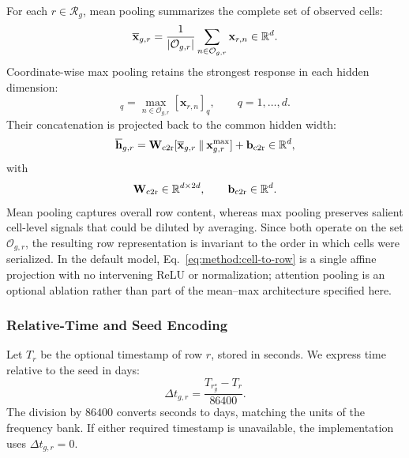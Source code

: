 For each \(r\in\mathcal R_g\), mean pooling summarizes the complete set of
observed cells:
\begin{equation}
  \overline{\mathbf x}_{g,r}
  =
  \frac{1}{|\mathcal O_{g,r}|}
  \sum_{n\in\mathcal O_{g,r}}\mathbf x_{r,n}
  \in\mathbb{R}^d.
\label{eq:method:mean-pooling}
\end{equation}
Coordinate-wise max pooling retains the strongest response in each hidden
dimension:
\begin{equation}
  [\mathbf x_{g,r}^{\max}]_q
  =
  \max_{n\in\mathcal O_{g,r}}[\mathbf x_{r,n}]_q,
  \qquad q=1,\ldots,d.
\label{eq:method:max-pooling}
\end{equation}
Their concatenation is projected back to the common hidden width:
\begin{equation}
  \overline{\mathbf h}_{g,r}
  =
  \mathbf W_{\mathrm{c2r}}
  [\overline{\mathbf x}_{g,r}\mathbin{\Vert}\mathbf x_{g,r}^{\max}]
  +\mathbf b_{\mathrm{c2r}}
  \in\mathbb{R}^d,
\label{eq:method:cell-to-row}
\end{equation}
with
\begin{equation}
  \mathbf W_{\mathrm{c2r}}\in\mathbb{R}^{d\times2d},
  \qquad
  \mathbf b_{\mathrm{c2r}}\in\mathbb{R}^d.
\label{eq:method:c2r-parameter-domains}
\end{equation}
Mean pooling captures overall row content, whereas max pooling preserves
salient cell-level signals that could be diluted by averaging. Since both
operate on the set \(\mathcal O_{g,r}\), the resulting row representation
is invariant to the order in which cells were serialized. In the default
model, Eq.~\eqref{eq:method:cell-to-row} is a single affine projection with
no intervening ReLU or normalization; attention pooling is an optional
ablation rather than part of the mean--max architecture specified here.

\subsubsection{Relative-Time and Seed Encoding}
\label{sec:method:time-seed-encoding}

Let \(T_r\) be the optional timestamp of row \(r\), stored in seconds. We
express time relative to the seed in days:
\begin{equation}
  \Delta t_{g,r}
  =
  \frac{T_{r_g^\star}-T_r}{86400}.
\label{eq:method:relative-time}
\end{equation}
The division by \(86400\) converts seconds to days, matching the units of
the frequency bank. If either required timestamp is unavailable, the
implementation uses \(\Delta t_{g,r}=0\).

